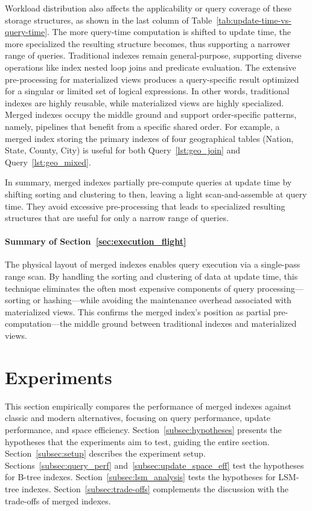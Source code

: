 \documentclass[sigconf, pdfa, nonacm]{acmart}
\newcommand\summary[1]{\paragraph{\textbf{#1}}}
\begin{document}
Workload distribution also affects the applicability or query coverage of these storage structures, as shown in the last column of Table~\ref{tab:update-time-vs-query-time}.
The more query-time computation is shifted to update time, the more specialized the resulting structure becomes, thus supporting a narrower range of queries.
Traditional indexes remain general-purpose, supporting diverse operations like index nested loop joins and predicate evaluation. 
The extensive pre-processing for materialized views produces a query-specific result optimized for a singular or limited set of logical expressions. 
In other words, traditional indexes are highly reusable, while materialized views are highly specialized.
Merged indexes occupy the middle ground and support order-specific patterns, namely, pipelines that benefit from a specific shared order.
For example, a merged index storing the primary indexes of four geographical tables (Nation, State, County, City) is useful for both Query~\ref{lst:geo_join} and Query~\ref{lst:geo_mixed}.

In summary, merged indexes partially pre-compute queries at update time by shifting sorting and clustering to then, leaving a light scan-and-assemble at query time. They avoid excessive pre-processing that leads to specialized resulting structures that are useful for only a narrow range of queries.

\summary{Summary of Section~\ref{sec:execution_flight}}

The physical layout of merged indexes enables query execution via a single-pass range scan. By handling the sorting and clustering of data at update time, this technique eliminates the often most expensive components of query processing---sorting or hashing---while avoiding the maintenance overhead associated with materialized views. This confirms the merged index's position as partial pre-computation---the middle ground between traditional indexes and materialized views.

\section{Experiments}\label{sec:experiments}

This section empirically compares the performance of merged indexes against classic and modern alternatives, focusing on query performance, update performance, and space efficiency.
Section~\ref{subsec:hypotheses} presents the hypotheses that the experiments aim to test, guiding the entire section. Section~\ref{subsec:setup} describes the experiment setup. Sections~\ref{subsec:query_perf} and~\ref{subsec:update_space_eff} test the hypotheses for B-tree indexes. 
Section~\ref{subsec:lsm_analysis} tests the hypotheses for LSM-tree indexes.
Section~\ref{subsec:trade-offs} complements the discussion with the trade-offs of merged indexes.
\end{document}
